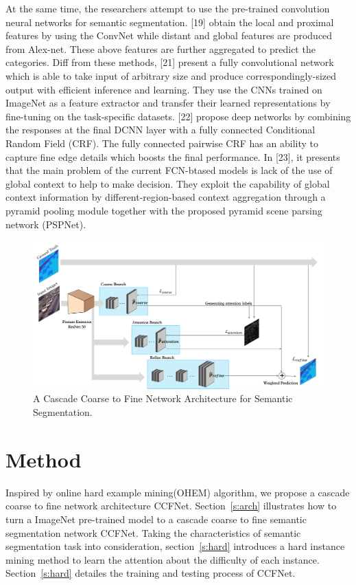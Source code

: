 \documentclass[10.5pt,compsoc]{TsT}
\newcommand{\upcite}[1]{\superscript{\textsuperscript{\cite{#1}}}}
\theoremstyle{mystyle}
\newcommand{\upcite}[1]{\textsuperscript{\cite{#1}}}
\begin{document}
{At the same time, the researchers attempt to use the pre-trained convolution neural networks for semantic segmentation. [19] obtain the local and proximal features by using the ConvNet while distant and global features are produced from Alex-net\upcite{20}. These above features are further aggregated to predict the categories. Diff from these methods, [21] present a fully convolutional network which is able to take input of arbitrary size and produce correspondingly-sized output with efficient inference and learning. They use the CNNs trained on ImageNet as a feature extractor and transfer their learned representations by fine-tuning on the task-specific datasets. [22] propose deep networks by combining the responses at the final DCNN layer with a fully connected Conditional Random Field (CRF). The fully connected pairwise CRF has an ability to capture fine edge details which boosts the final performance. In [23], it presents that the main problem of the current FCN-btased models is lack of the use of global context to help to make decision. They exploit the capability of global context information by different-region-based context aggregation through a pyramid pooling module together with the proposed pyramid scene parsing network (PSPNet).

\begin{figure}[t]
\centering
\includegraphics[width=1.9\columnwidth]{fig2.png}
\caption{A Cascade Coarse to Fine Network Architecture for Semantic Segmentation.}
\label{fig:arch}
\end{figure} 

\section{Method}
\label{s:Method}
\noindent


Inspired by online hard example mining(OHEM) algorithm, we propose a cascade coarse to fine network architecture CCFNet. 
Section~\ref{s:arch} illustrates how to turn a ImageNet pre-trained model to a cascade coarse to fine semantic segmentation network CCFNet.
Taking the characteristics of semantic segmentation task into consideration, section~\ref{s:hard} introduces a hard instance mining method to learn the attention about the difficulty of each instance.
Section~\ref{s:hard} detailes the training and testing process of CCFNet. 

}
\end{document}
